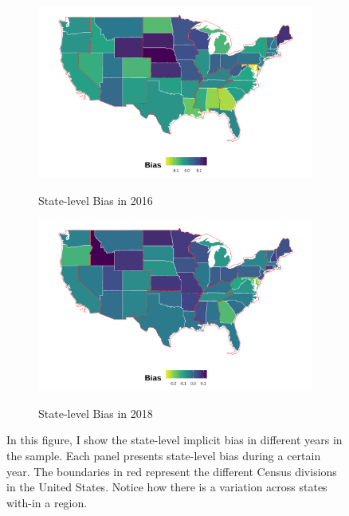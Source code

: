 \documentclass[12pt,english]{article}
\begin{document}
\begin{center}
\begin{figure}[H]
\begin{subfigure}{.45\textwidth}
\label{fig:skiniat-map-2014}
\end{subfigure}
\hfill%
\begin{subfigure}{.45\textwidth}
\caption{State-level Bias in 2016}
\centering
\includegraphics[width=0.9\linewidth]{figure/2016skinmap.png} 
\label{fig:skiniat-map-2016}
\end{subfigure}
\hfill%
\begin{subfigure}{.45\textwidth}
\hspace{1cm}
\caption{State-level Bias in 2018}
\centering
\includegraphics[width=0.9\linewidth]{figure/2018skinmap.png} 
\label{fig:skiniat-map-2018}
\hfill%
\end{subfigure}
\caption*{\footnotesize{In this figure, I show the state-level implicit bias in different years in the sample. Each panel presents state-level bias during a certain year. The boundaries in red represent the different Census divisions in the United States. Notice how there is a variation across states with-in a region.}}
\end{figure}
\end{center}
\end{document}
